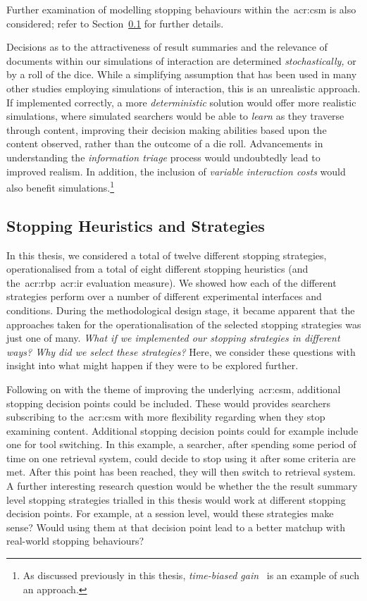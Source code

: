 Further examination of modelling stopping behaviours within the~\gls{acr:csm} is also considered; refer to Section~\ref{sec:conclusions:future:stopping} for further details.

 Decisions as to the attractiveness of result summaries and the relevance of documents within our simulations of interaction are determined \emph{stochastically,} or by a roll of the dice. While a simplifying assumption that has been used in many other studies employing simulations of interaction, this is an unrealistic approach. If implemented correctly, a more \emph{deterministic} solution would offer more realistic simulations, where simulated searchers would be able to \emph{learn} as they traverse through content, improving their decision making abilities based upon the content observed, rather than the outcome of a die roll. Advancements in understanding the \emph{information triage} process would undoubtedly lead to improved realism. In addition, the inclusion of \emph{variable interaction costs} would also benefit simulations.\footnote{As discussed previously in this thesis, \emph{time-biased gain}~\citep{smucker2012tbg} is an example of such an approach.}

\subsection{Stopping Heuristics and Strategies}\label{sec:conclusions:future:stopping}
In this thesis, we considered a total of twelve different stopping strategies, operationalised from a total of eight different stopping heuristics (and the~\gls{acr:rbp}~\gls{acr:ir} evaluation measure). We showed how each of the different strategies perform over a number of different experimental interfaces and conditions. During the methodological design stage, it became apparent that the approaches taken for the operationalisation of the selected stopping strategies was just one of many. \emph{What if we implemented our stopping strategies in different ways? Why did we select these strategies?} Here, we consider these questions with insight into what might happen if they were to be explored further.

Following on with the theme of improving the underlying~\gls{acr:csm}, additional stopping decision points could be included. These would provides searchers subscribing to the~\gls{acr:csm} with more flexibility regarding when they stop examining content. Additional stopping decision points could for example include one for tool switching. In this example, a searcher, after spending some period of time on one retrieval system, could decide to stop using it after some criteria are met. After this point has been reached, they will then switch to retrieval system. A further interesting research question would be whether the the result summary level stopping strategies trialled in this thesis would work at different stopping decision points. For example, at a session level, would these strategies make sense? Would using them at that decision point lead to a better matchup with real-world stopping behaviours?

